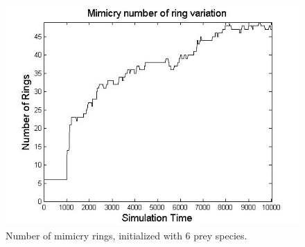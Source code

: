 \documentclass[letterpaper]{article}
\numberwithin{equation}{section}
\begin{document}
\begin{figure}[H]
	\centering
	\includegraphics[scale=0.50]{../tex/images/ringSize10k-6Prey}
	\caption[Number of mimicry rings (6 prey species)]{Number of mimicry rings, initialized with 6 prey species.}
	\label{fig:ringSize10k-6-Prey}
\end{figure}
\end{document}

